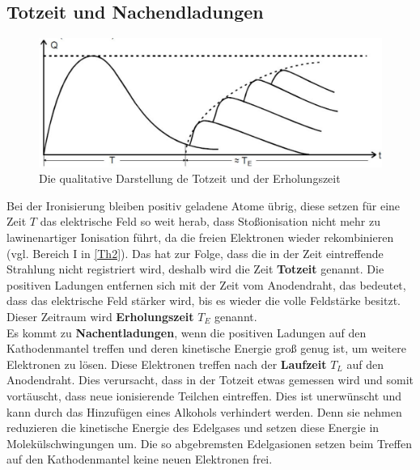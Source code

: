 \subsection{Totzeit und Nachendladungen}
\begin{figure}
\centering
\includegraphics[scale=0.5]{Grafiken/Totzeit.pdf}
\caption{Die qualitative Darstellung de Totzeit und der Erholungszeit \cite{V703}\label{Totzeit}}

\end{figure}
Bei der Ironisierung bleiben positiv geladene Atome übrig, diese setzen für eine Zeit $T$ das elektrische Feld so weit herab, dass Stoßionisation nicht mehr zu lawinenartiger Ionisation führt, da die freien Elektronen wieder rekombinieren (vgl. Bereich I in \cref{Th2}). Das hat zur Folge, dass die in der Zeit eintreffende Strahlung nicht registriert wird, deshalb wird die Zeit \textbf{Totzeit} genannt. Die positiven Ladungen entfernen sich mit der Zeit vom Anodendraht, das bedeutet, dass das elektrische Feld stärker wird, bis es wieder die volle Feldstärke besitzt. Dieser Zeitraum wird \textbf{Erholungszeit} $T_E$ genannt.\\
Es kommt zu \textbf{Nachentladungen}, wenn die positiven Ladungen auf den Kathodenmantel treffen und deren kinetische 
Energie groß genug ist, um weitere Elektronen zu lösen. Diese Elektronen treffen nach der 
\textbf{Laufzeit} $T_L$ auf den Anodendraht. Dies verursacht, dass in der Totzeit etwas gemessen wird und somit 
vortäuscht, dass neue ionisierende Teilchen eintreffen. Dies ist unerwünscht und kann durch das Hinzufügen eines 
Alkohols verhindert werden. Denn sie nehmen reduzieren die kinetische Energie des Edelgases und setzen diese Energie in 
Molekülschwingungen um. Die so abgebremsten Edelgasionen setzen beim Treffen auf den Kathodenmantel keine neuen Elektronen frei.

